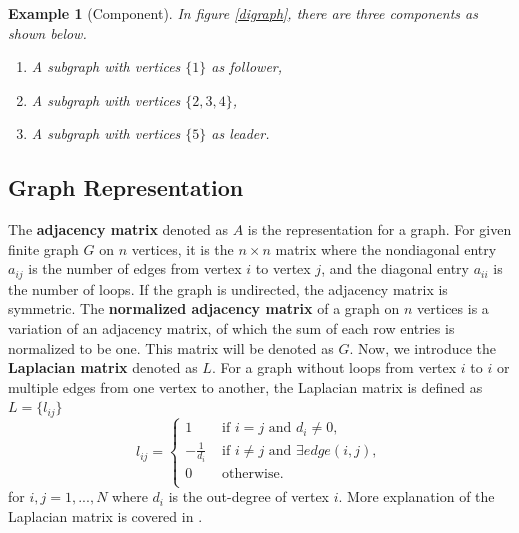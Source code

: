 \documentclass[11pt, a4paper, oneside, openany, reqno]{book}
\newtheorem{example}{Example}
\theoremstyle{definition}
\theoremstyle{remark}
\numberwithin{equation}{chapter} %
\begin{document}
\begin{example}[Component]
	In figure \ref{digraph}, there are three components as shown below.
	\begin{enumerate}
		\item A subgraph with vertices $ \lbrace 1 \rbrace $ as follower,
		\item A subgraph with vertices $ \lbrace 2,3,4 \rbrace $,
		\item A subgraph with vertices $ \lbrace 5 \rbrace $ as leader.
	\end{enumerate}
\end{example}

\subsection{Graph Representation}

The \textbf{adjacency matrix} denoted as $ A $ is the representation for a graph.
For given finite graph $ G $ on $ n $ vertices, it is the $ n \times n $ matrix 
where the nondiagonal entry $ a_{ij} $ is the number of edges from vertex $ i $ to vertex $ j $, 
and the diagonal entry $ a_{ii} $ is the number of loops.
If the graph is undirected, the adjacency matrix is symmetric.
The \textbf{normalized adjacency matrix} of a graph on $ n $ vertices is a variation of an adjacency matrix, 
of which the sum of each row entries is normalized to be one. This matrix will be denoted as $ G $.
Now, we introduce the \textbf{Laplacian matrix} denoted as $ L $. 
For a graph without loops from vertex $ i $ to $ i $ or multiple edges from one vertex to another,
the Laplacian matrix is defined as 
$ L = \lbrace l_{ij}  \rbrace$
\begin{equation}\label{laplacian}
l_{ij}=\begin{cases}
1 & \text{ if } i=j \text{ and } d_i \neq 0, \\
-\frac{1}{d_i} & \text{ if } i \neq j \text{ and } \exists edge(i, j), \\
0 & \text{ otherwise.}  \\
\end{cases}
\end{equation} 
for $i,j=1, ..., N$ where $d_i$ is the out-degree of vertex $i$. 
More explanation of the Laplacian matrix is covered in \cite{russell}.
\end{document}

